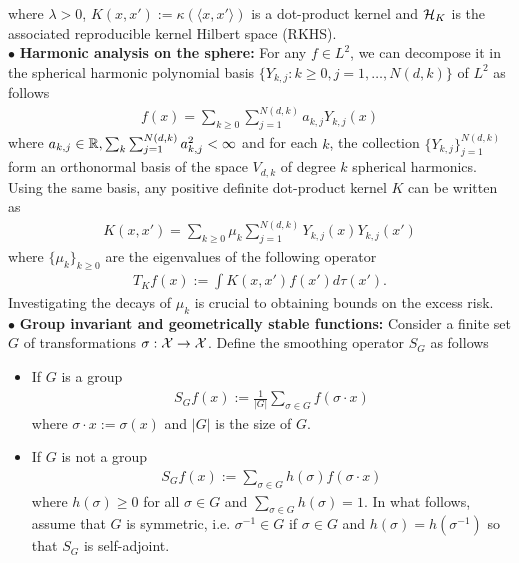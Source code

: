 where $\lambda>0$, $K(x,x'):=\kappa(\langle x,x'\rangle)$ is a dot-product kernel and $\mathcal{H}_K$ is the associated reproducible kernel Hilbert space (RKHS).\\
$\bullet$ \textbf{Harmonic analysis on the sphere:} For any $f\in L^2$, we can decompose it in the spherical harmonic polynomial basis $\{Y_{k,j}:k\ge0,j=1,\ldots,N(d,k)\}$ of $L^2$ as follows
\begin{align}
    f(x) = \sum_{k\ge 0}\sum_{j=1}^{N(d,k)}a_{k,j}Y_{k,j}(x)
\end{align}
where $a_{k,j}\in \mathbb{R}, \sum_k\sum_{j=1}^{N(d,k)}a_{k,j}^2<\infty$ and for each $k$, 
the collection $\{Y_{k,j}\}_{j=1}^{N(d,k)}$ form an orthonormal basis of the space $V_{d,k}$ of degree $k$ spherical harmonics. Using the same basis, any positive definite dot-product kernel $K$ can be written as
\begin{align}
    K(x,x') = \sum_{k\ge 0}\mu_k\sum_{j=1}^{N(d,k)}Y_{k,j}(x)Y_{k,j}(x')
\end{align}
where $\{\mu_k\}_{k\ge0}$ are the eigenvalues of the following operator
\begin{align}
    T_Kf(x) := \int K(x,x')f(x')d\tau(x').
\end{align}
Investigating the decays of $\mu_k$ is crucial to obtaining bounds on the excess risk.\\
$\bullet$ \textbf{Group invariant and geometrically stable functions:} Consider a finite set $G$ of transformations $\sigma:\mathcal{X}\to\mathcal{X}$. Define the smoothing operator $S_G$ as follows
\begin{itemize}
    \item If $G$ is a group
    \begin{align}
        S_Gf(x) := \frac{1}{|G|}\sum_{\sigma\in G}f(\sigma\cdot x)
    \end{align}
    where $\sigma\cdot x := \sigma(x)$ and $|G|$ is the size of $G$.
    \item If $G$ is not a group
    \begin{align}
        S_Gf(x) := \sum_{\sigma\in G}h(\sigma)f(\sigma\cdot x)
    \end{align}
    where $h(\sigma)\ge0$ for all $\sigma\in G$ and $\sum_{\sigma\in G}h(\sigma)=1$. In what follows, assume that $G$ is symmetric, i.e. $\sigma^{-1}\in G$ if $\sigma\in G$ and $h(\sigma)=h(\sigma^{-1})$ so that $S_G$ is self-adjoint.
\end{itemize}
